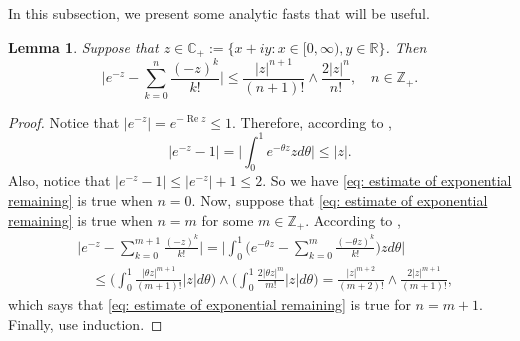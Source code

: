 \documentclass[12pt]{amsart}
\theoremstyle{plain}
\newtheorem{lem}[thm]{Lemma}
\theoremstyle{definition}
\numberwithin{equation}{section}
\begin{document}
\appendix
\section{}

\subsection{}
    In this subsection, we present some analytic fasts that will be useful.
\begin{lem}
\label{lem: estimate of exponential remaining}
    Suppose that $z\in \mathbb C_+:= \{x+iy: x \in [0,\infty), y \in \mathbb R\}$. Then
\begin{equation}
\label{eq: estimate of exponential remaining}
    \Big|e^{-z} - \sum_{k=0}^n \frac{(-z)^k}{k!} \Big|
    \leq \frac{|z|^{n+1}}{(n+1)!} \wedge \frac{2|z|^{n}}{n!}, \quad n\in \mathbb Z_+.
\end{equation}
\end{lem}
\begin{proof}
    Notice that $|e^{-z}| = e^{- \operatorname{Re} z} \leq 1$.
    Therefore, according to \cite[Theorem 7.20.]{Rudin1987Real},
\begin{equation}
    |e^{-z} - 1| = \Big| \int_0^1 e^{-\theta z} z d\theta\Big|
    \leq |z|.
\end{equation}
    Also, notice that $|e^{-z} - 1| \leq |e^{-z}|+1 \leq 2$.
    So we have \eqref{eq: estimate of exponential remaining} is true when $n = 0$.
    Now, suppose that \eqref{eq: estimate of exponential remaining} is true when $n = m$ for some $m \in \mathbb Z_+$.
    According to \cite[Theorem 7.20.]{Rudin1987Real},
\begin{align}
    &\Big|e^{-z} - \sum_{k=0}^{m+1} \frac{(-z)^k}{k!}\Big|
    = \Big| \int_0^1\Big(e^{-\theta z} - \sum_{k=0}^m \frac{(-\theta z)^k}{k!} \Big) z d\theta \Big|
    \\&\quad \leq  \Big(\int_0^1 \frac{|\theta z|^{m+1}}{(m+1)!} |z| d\theta\Big) \wedge \Big(\int_0^1 \frac{2|\theta z|^{m}}{m!} |z| d\theta\Big)
    = \frac{|z|^{m+2}}{(m+2)!} \wedge \frac{2|z|^{m+1}}{(m+1)!},
\end{align}
    which says that \eqref{eq: estimate of exponential remaining} is true for $n = m + 1$.
    Finally, use induction.
\end{proof}
\end{document}

